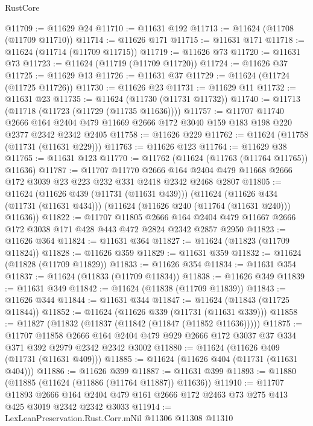 \begin{lexlean}{RustCore}
\begin{coremodule}
@11709 := @11629 @24
@11710 := @11631 @192
@11713 := @11624 (@11708 (@11709 @11710))
@11714 := @11626 @171
@11715 := @11631 @171
@11718 := @11624 (@11714 (@11709 @11715))
@11719 := @11626 @73
@11720 := @11631 @73
@11723 := @11624 (@11719 (@11709 @11720))
@11724 := @11626 @37
@11725 := @11629 @13
@11726 := @11631 @37
@11729 := @11624 (@11724 (@11725 @11726))
@11730 := @11626 @23
@11731 := @11629 @11
@11732 := @11631 @23
@11735 := @11624 (@11730 (@11731 @11732))
@11740 := @11713 (@11718 (@11723 (@11729 (@11735 @11636))))
@11757 := @11707
    @11740
    @2666
    @164
    @2404
    @479
    @11669
    @2666
    @172
    @3040
    @159
    @183
    @198
    @220
    @2377
    @2342
    @2342
    @2405
@11758 := @11626 @229
@11762 := @11624 (@11758 (@11731 (@11631 @229)))
@11763 := @11626 @123
@11764 := @11629 @38
@11765 := @11631 @123
@11770 := @11762 (@11624 (@11763 (@11764 @11765)) @11636)
@11787 := @11707
    @11770
    @2666
    @164
    @2404
    @479
    @11668
    @2666
    @172
    @3039
    @23
    @223
    @232
    @331
    @2418
    @2342
    @2468
    @2807
@11805 := @11624
    (@11626 @439 (@11731 (@11631 @439)))
    (@11624
      (@11626 @434 (@11731 (@11631 @434)))
      (@11624 (@11626 @240 (@11764 (@11631 @240))) @11636))
@11822 := @11707
    @11805
    @2666
    @164
    @2404
    @479
    @11667
    @2666
    @172
    @3038
    @171
    @428
    @443
    @472
    @2824
    @2342
    @2857
    @2950
@11823 := @11626 @364
@11824 := @11631 @364
@11827 := @11624 (@11823 (@11709 @11824))
@11828 := @11626 @359
@11829 := @11631 @359
@11832 := @11624 (@11828 (@11709 @11829))
@11833 := @11626 @354
@11834 := @11631 @354
@11837 := @11624 (@11833 (@11709 @11834))
@11838 := @11626 @349
@11839 := @11631 @349
@11842 := @11624 (@11838 (@11709 @11839))
@11843 := @11626 @344
@11844 := @11631 @344
@11847 := @11624 (@11843 (@11725 @11844))
@11852 := @11624 (@11626 @339 (@11731 (@11631 @339)))
@11858 := @11827 (@11832 (@11837 (@11842 (@11847 (@11852 @11636)))))
@11875 := @11707
    @11858
    @2666
    @164
    @2404
    @479
    @929
    @2666
    @172
    @3037
    @37
    @334
    @371
    @392
    @2979
    @2342
    @2342
    @3002
@11880 := @11624 (@11626 @409 (@11731 (@11631 @409)))
@11885 := @11624 (@11626 @404 (@11731 (@11631 @404)))
@11886 := @11626 @399
@11887 := @11631 @399
@11893 := @11880 (@11885 (@11624 (@11886 (@11764 @11887)) @11636))
@11910 := @11707
    @11893
    @2666
    @164
    @2404
    @479
    @161
    @2666
    @172
    @2463
    @73
    @275
    @413
    @425
    @3019
    @2342
    @2342
    @3033
@11914 := LexLeanPreservation.Rust.Corr.mNil @11306 @11308 @11310

\end{coremodule}
\end{lexlean}
